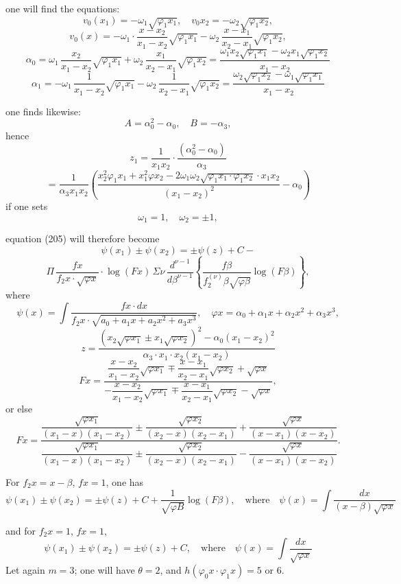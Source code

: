 \documentclass{article}
\begin{document}
one will find the equations:
\[ v_0(x_1) = -\omega_1\sqrt{\varphi_1 x_1}, \quad v_0 x_2 = -\omega_2\sqrt{\varphi_1 x_2}, \]
\[ v_0(x) = -\omega_1 \cdot \frac{x-x_2}{x_1-x_2}\sqrt{\varphi_1 x_1} - \omega_2\,\frac{x-x_1}{x_2-x_1}\sqrt{\varphi_1 x_2}, \]
\[ \alpha_0 = \omega_1\,\frac{x_2}{x_1-x_2}\sqrt{\varphi_1 x_1}+\omega_2\,\frac{x_1}{x_2-x_1}\sqrt{\varphi_1 x_2} = \frac{\omega_1 x_2\sqrt{\varphi_1 x_1}-\omega_2 x_1\sqrt{\varphi_1 x_2}}{x_1-x_2} \]
\[ \alpha_1 = -\omega_1\,\frac{1}{x_1-x_2}\sqrt{\varphi_1 x_1}-\omega_2\,\frac{1}{x_2-x_1}\sqrt{\varphi_1 x_2} = \frac{\omega_2\sqrt{\varphi_1 x_2}-\omega_1\sqrt{\varphi_1 x_1}}{x_1-x_2} \]

one finds likewise:
\[ A = \alpha_0^{2}-\alpha_0, \quad B = -\alpha_3, \]
hence
\[ z_1 = \frac{1}{x_1 x_2} \cdot \frac{(\alpha_0^{2}-\alpha_0)}{\alpha_3} \]
\[ = \frac{1}{\alpha_3 x_1 x_2}\left(\frac{x_2^{2}\varphi_1 x_1+x_1^{2}\varphi x_2-2\omega_1\omega_2\sqrt{\varphi_1 x_1 \cdot \varphi_1 x_2} \cdot x_1 x_2}{(x_1-x_2)^{2}}-\alpha_0\right) \]
if one sets
\[ \omega_1 = 1, \quad \omega_2 = \pm 1, \]

equation (205) will therefore become
\[ \psi(x_1) \pm \psi(x_2) = \pm\psi(z) + C - \]
\[ \Pi\,\frac{f x}{f_2 x \cdot \sqrt{\varphi x}} \cdot \log(F x)\,\Sigma\nu\,\frac{d^{\nu-1}}{d\beta^{\nu-1}} \left\{ \frac{f\beta}{f_2^{(\nu)}\beta\sqrt{\varphi\beta}}\log(F\beta) \right\}, \tag{206} \]
where
\[ \psi(x) = \int \frac{f x \cdot dx}{f_2 x \cdot \sqrt{a_0+a_1 x+a_2 x^{2}+a_3 x^{3}}}, \quad \varphi x = \alpha_0+\alpha_1 x+\alpha_2 x^{2}+\alpha_3 x^{3}, \]
\[ z = \frac{\left(x_2\sqrt{\varphi x_1} \pm x_1\sqrt{\varphi x_2}\right)^{2}-\alpha_0(x_1-x_2)^{2}}{\alpha_3 \cdot x_1 \cdot x_2(x_1-x_2)} \]
\[ F x = \dfrac{\dfrac{x-x_2}{x_1-x_2}\sqrt{\varphi x_1} \mp \dfrac{x-x_1}{x_2-x_1}\sqrt{\varphi x_2} + \sqrt{\varphi x}}{-\dfrac{x-x_2}{x_1-x_2}\sqrt{\varphi x_1} \mp \dfrac{x-x_1}{x_2-x_1}\sqrt{\varphi x_2} - \sqrt{\varphi x}}, \]
or else
\[ F x = \dfrac{\dfrac{\sqrt{\varphi x_1}}{(x_1-x)(x_1-x_2)} \pm \dfrac{\sqrt{\varphi x_2}}{(x_2-x)(x_2-x_1)} + \dfrac{\sqrt{\varphi x}}{(x-x_1)(x-x_2)}}{\dfrac{\sqrt{\varphi x_1}}{(x_1-x)(x_1-x_2)} \pm \dfrac{\sqrt{\varphi x_2}}{(x_2-x)(x_2-x_1)} - \dfrac{\sqrt{\varphi x}}{(x-x_1)(x-x_2)}}. \]

For $f_2 x = x-\beta$, $f x = 1$, one has
\[ \psi(x_1) \pm \psi(x_2) = \pm\psi(z)+C+\frac{1}{\sqrt{\varphi B}}\log(F\beta), \quad \text{where} \quad \psi(x) = \int \frac{dx}{(x-\beta)\sqrt{\varphi x}} \]

and for $f_2 x = 1$, $f x = 1$,
\[ \psi(x_1) \pm \psi(x_2) = \pm\psi(z)+C, \quad \text{where} \quad \psi(x) = \int \frac{dx}{\sqrt{\varphi x}} \]
Let again $m = 3$; one will have $\theta = 2$, and $h(\varphi_0 x \cdot \varphi_1 x) = 5$ or $6$.
\end{document}
